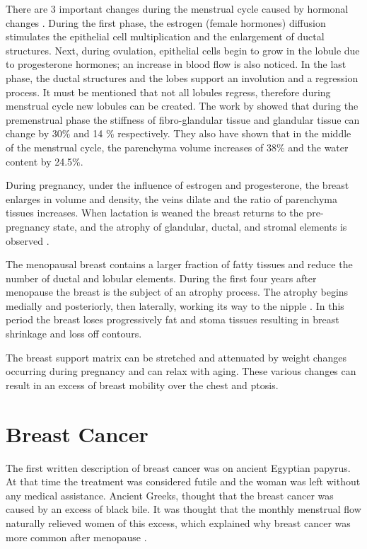 There are 3 important changes during the menstrual cycle caused by hormonal changes \citep{andolina2011mammographic}. During the first phase, the estrogen (female hormones) diffusion stimulates the epithelial cell multiplication and the enlargement of ductal structures. Next, during ovulation, epithelial cells begin to grow in the lobule due to progesterone hormones; an increase in blood flow is also noticed. In the last phase, the ductal structures and the lobes support an involution and a regression process. It must be mentioned that not all lobules regress, therefore during menstrual cycle new lobules can be created.   The work by \cite{lorenzen_menstrual-cycle_2003} showed that during the premenstrual phase the stiffness of fibro-glandular tissue and glandular tissue can change by 30\% and 14 \% respectively. They also have shown that in the middle of the menstrual cycle, the parenchyma volume increases of 38\% and the water content by 24.5\%.

During pregnancy, under the influence of estrogen and progesterone, the breast enlarges in volume and density, the veins dilate and the ratio of parenchyma tissues increases.  When lactation is weaned the breast returns to the pre-pregnancy state, and the atrophy of glandular, ductal, and stromal elements  is observed \citep{pandya_breast_2011}.

The menopausal breast contains a larger fraction of fatty tissues and reduce the number of ductal and lobular elements. During the first four years after menopause the breast is the subject of an atrophy process. The atrophy begins medially and posteriorly, then laterally, working its way to the nipple \citep{andolina2011mammographic}. In this period the breast loses progressively fat and stoma tissues resulting in breast shrinkage and loss off contours.

 The breast support matrix can be stretched and attenuated by weight changes occurring during pregnancy and can relax with aging. These various changes can result in an excess of breast mobility over the chest and ptosis. 

\section{Breast Cancer}\label{section:breastcancer}

The first written description of breast cancer was on ancient Egyptian papyrus. At that time the treatment was considered futile and the woman was left without any medical assistance. Ancient Greeks, thought that the breast cancer was caused by an excess of black bile. It was thought that the monthly menstrual flow naturally relieved women of this excess, which explained why breast cancer was more common after menopause \citep{andolina2011mammographic}.

